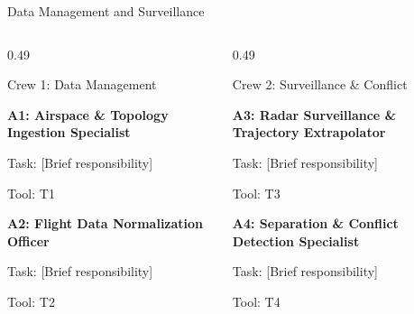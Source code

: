 

\begin{frame}{Data Management and Surveillance}
\small

\begin{columns}[T,onlytextwidth]

\begin{column}{0.49\textwidth}

\begin{block}{Crew 1: Data Management}
\scriptsize

\textbf{A1: Airspace \& Topology
Ingestion Specialist}

\vspace{0.1cm}
Task: [Brief responsibility]

Tool: T1

\vspace{0.3cm}

\textbf{A2: Flight Data
Normalization Officer}

\vspace{0.1cm}
Task: [Brief responsibility]

Tool: T2

\end{block}

\end{column}

\begin{column}{0.49\textwidth}

\begin{block}{Crew 2: Surveillance \& Conflict}
\scriptsize

\textbf{A3: Radar Surveillance \&
Trajectory Extrapolator}

\vspace{0.1cm}
Task: [Brief responsibility]

Tool: T3

\vspace{0.3cm}

\textbf{A4: Separation \& Conflict
Detection Specialist}

\vspace{0.1cm}
Task: [Brief responsibility]

Tool: T4

\end{block}

\end{column}

\end{columns}

\end{frame}
